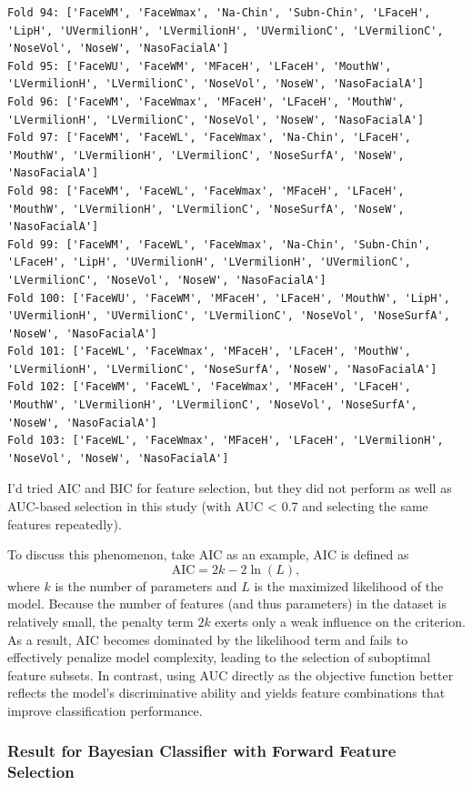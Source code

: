 \documentclass[12pt,a4paper]{article}
\begin{document}
\begin{verbatim}
Fold 94: ['FaceWM', 'FaceWmax', 'Na-Chin', 'Subn-Chin', 'LFaceH', 'LipH', 'UVermilionH', 'LVermilionH', 'UVermilionC', 'LVermilionC', 'NoseVol', 'NoseW', 'NasoFacialA']
Fold 95: ['FaceWU', 'FaceWM', 'MFaceH', 'LFaceH', 'MouthW', 'LVermilionH', 'LVermilionC', 'NoseVol', 'NoseW', 'NasoFacialA']
Fold 96: ['FaceWM', 'FaceWmax', 'MFaceH', 'LFaceH', 'MouthW', 'LVermilionH', 'LVermilionC', 'NoseVol', 'NoseW', 'NasoFacialA']
Fold 97: ['FaceWM', 'FaceWL', 'FaceWmax', 'Na-Chin', 'LFaceH', 'MouthW', 'LVermilionH', 'LVermilionC', 'NoseSurfA', 'NoseW', 'NasoFacialA']
Fold 98: ['FaceWM', 'FaceWL', 'FaceWmax', 'MFaceH', 'LFaceH', 'MouthW', 'LVermilionH', 'LVermilionC', 'NoseSurfA', 'NoseW', 'NasoFacialA']
Fold 99: ['FaceWM', 'FaceWL', 'FaceWmax', 'Na-Chin', 'Subn-Chin', 'LFaceH', 'LipH', 'UVermilionH', 'LVermilionH', 'UVermilionC', 'LVermilionC', 'NoseVol', 'NoseW', 'NasoFacialA']
Fold 100: ['FaceWU', 'FaceWM', 'MFaceH', 'LFaceH', 'MouthW', 'LipH', 'UVermilionH', 'UVermilionC', 'LVermilionC', 'NoseVol', 'NoseSurfA', 'NoseW', 'NasoFacialA']
Fold 101: ['FaceWL', 'FaceWmax', 'MFaceH', 'LFaceH', 'MouthW', 'LVermilionH', 'LVermilionC', 'NoseSurfA', 'NoseW', 'NasoFacialA']
Fold 102: ['FaceWM', 'FaceWL', 'FaceWmax', 'MFaceH', 'LFaceH', 'MouthW', 'LVermilionH', 'LVermilionC', 'NoseVol', 'NoseSurfA', 'NoseW', 'NasoFacialA']
Fold 103: ['FaceWL', 'FaceWmax', 'MFaceH', 'LFaceH', 'LVermilionH', 'NoseVol', 'NoseW', 'NasoFacialA']
\end{verbatim}

I'd tried AIC and BIC for feature selection, but they did not perform as well as AUC-based selection in this study (with AUC < 0.7 and selecting the same features repeatedly). 

To discuss this phenomenon, take AIC as an example, AIC is defined as
\begin{equation}
\text{AIC} = 2k - 2\ln(L),
\end{equation}
where $k$ is the number of parameters and $L$ is the maximized likelihood of the model.  Because the number of features (and thus parameters) in the dataset is relatively small, the penalty term $2k$ exerts only a weak influence on the criterion. 
As a result, AIC becomes dominated by the likelihood term and fails to effectively penalize model complexity, leading to the selection of suboptimal feature subsets. 
In contrast, using AUC directly as the objective function better reflects the model's discriminative ability and yields feature combinations that improve classification performance.

\subsubsection{Result for Bayesian Classifier with Forward Feature Selection}
\end{document}
